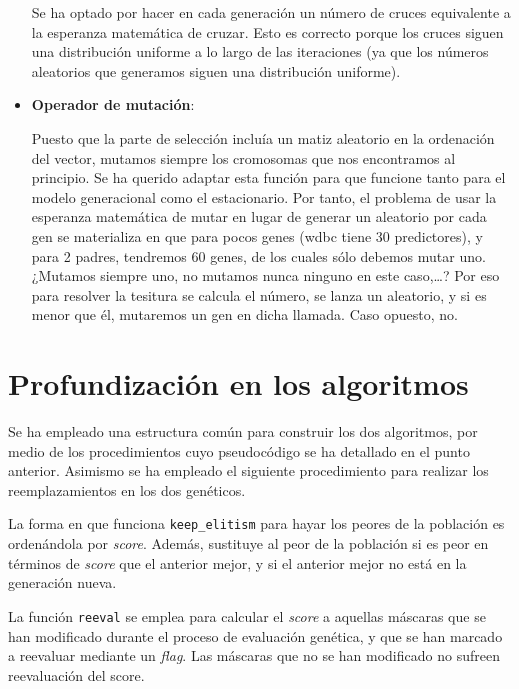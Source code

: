 \documentclass[a4paper,11pt]{article}
\begin{document}
\begin{itemize}
  
  Se ha optado por hacer en cada generación un número de cruces equivalente a la esperanza matemática de cruzar. Esto es
  correcto porque los cruces siguen una distribución uniforme a lo largo de las iteraciones (ya que los números aleatorios
  que generamos siguen una distribución uniforme).
  
\item \textbf{Operador de mutación}:

  \small\texttt{}
  \normalsize
  
  Puesto que la parte de selección incluía un matiz aleatorio en la ordenación del vector, mutamos siempre los cromosomas
  que nos encontramos al principio. Se ha querido adaptar esta función para que funcione tanto para el modelo generacional
  como el estacionario. Por tanto, el problema de usar la esperanza matemática de mutar en lugar de generar un aleatorio
  por cada gen se materializa en que para pocos genes (wdbc tiene 30 predictores), y para 2 padres, tendremos 60 genes,
  de los cuales sólo debemos mutar uno. ¿Mutamos siempre uno, no mutamos nunca ninguno en este caso,\ldots? Por eso para
  resolver la tesitura se calcula el número, se lanza un aleatorio, y si es menor que él, mutaremos un gen en dicha llamada.
  Caso opuesto, no.

\end{itemize}

\newpage
\section{Profundización en los algoritmos}
Se ha empleado una estructura común para construir los dos algoritmos, por medio de los procedimientos cuyo pseudocódigo se
ha detallado en el punto anterior. Asimismo se ha empleado el siguiente procedimiento para realizar los reemplazamientos
en los dos genéticos.

\small{\texttt{}}
\normalsize

La forma en que funciona \texttt{keep\_elitism} para hayar los peores de la población es ordenándola por \textit{score}.
Además, sustituye al peor de la población si es peor en términos de \textit{score} que el anterior mejor, y si el anterior
mejor no está en la generación nueva.

La función \texttt{reeval} se emplea para calcular el \textit{score} a aquellas máscaras que se han modificado durante
el proceso de evaluación genética, y que se han marcado a reevaluar mediante un \textit{flag}. Las máscaras que no se han
modificado no sufreen reevaluación del score.
\end{document}
